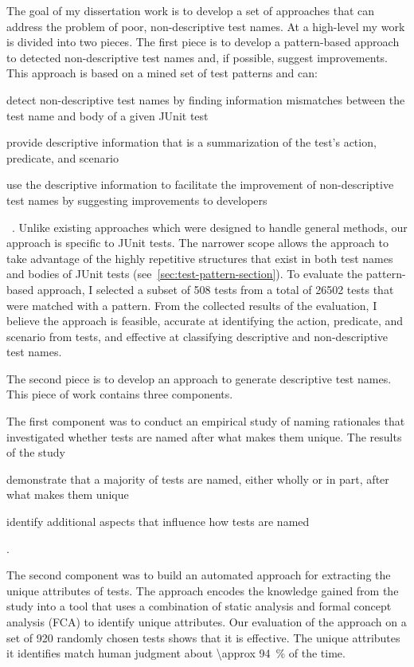 The goal of my dissertation work is to develop a set of approaches that can address the problem of poor, non-descriptive test names.
%
At a high-level my work is divided into two pieces.
%
The first piece is to develop a pattern-based approach to detected non-descriptive test names and, if possible, suggest improvements.
%
This approach is based on a mined set of test patterns and can:
%
\begin{enumerate*}
\item detect non-descriptive test names by finding information mismatches between the test name and body of a given JUnit test
\item provide descriptive information that is a summarization of the test's action, predicate, and scenario
\item use the descriptive information to facilitate the improvement of non-descriptive test names by suggesting improvements to developers
\end{enumerate*}~\cite{wu2020pattern}.
%
Unlike existing approaches which were designed to handle general methods, our approach is specific to JUnit tests.
%
The narrower scope allows the approach to take advantage of the highly repetitive structures that exist in both test names and bodies of JUnit tests (see~\cref{sec:test-pattern-section}).
To evaluate the pattern-based approach, I selected a subset of \num{508} tests from a total of \num{26502} tests that were matched with a pattern.
%
From the collected results of the evaluation, I believe the approach is feasible, accurate at identifying the action, predicate, and
scenario from tests, and effective at classifying descriptive and
non-descriptive test names.


The second piece is to develop an approach to generate descriptive test names.
% 
This piece of work contains three components.

The first component was to conduct an empirical study of naming rationales that investigated whether tests are named after what makes them unique.
%
The results of the study
\begin{enumerate*}
\item demonstrate that a majority of tests are named, either wholly or in part, after what makes them unique
\item identify additional aspects that influence how tests are named
\end{enumerate*}.


The second component was to build an automated approach for extracting the unique attributes of tests.
% 
The approach encodes the knowledge gained from the study into a tool that uses a combination of static analysis and formal concept analysis (FCA) to identify unique attributes. 
%
Our evaluation of the approach on a set of \num{920} randomly chosen tests shows that it is effective.
%
The unique attributes it identifies match human judgment about \SI{\approx 94}{\percent} of the time.


